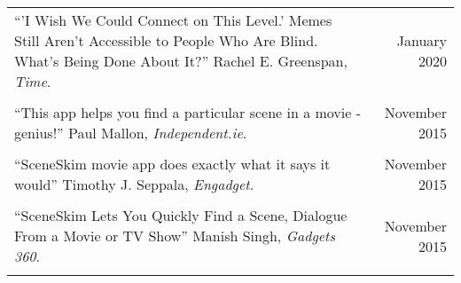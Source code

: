 \begin{longtable}{Xr}
	``'I Wish We Could Connect on This Level.' Memes Still Aren't Accessible to People Who Are Blind. What's Being Done About It?'' Rachel E. Greenspan, \textit{Time}. & January 2020 \\
	\\

	``This app helps you find a particular scene in a movie - genius!'' Paul Mallon, \textit{Independent.ie}. & November 2015 \\
	\\

	``SceneSkim movie app does exactly what it says it would'' Timothy J. Seppala, \textit{Engadget}. & November 2015 \\
	\\

	``SceneSkim Lets You Quickly Find a Scene, Dialogue From a Movie or TV Show'' Manish Singh, \textit{Gadgets 360}. & November 2015 \\
	\\

\end{longtable}